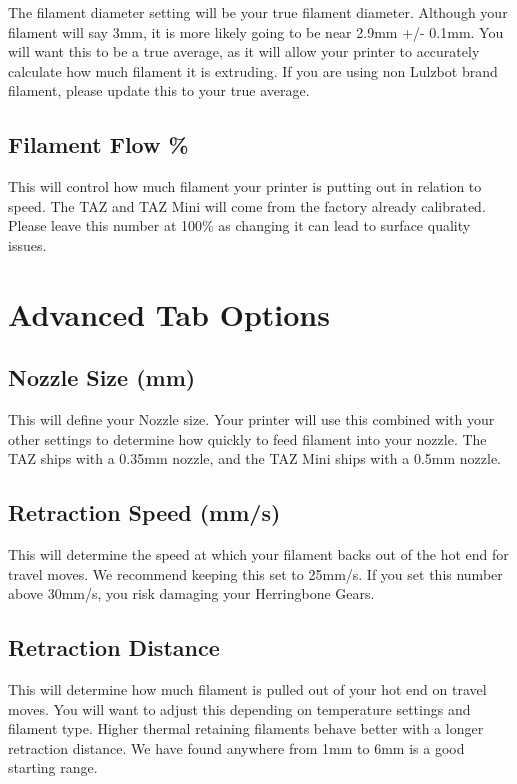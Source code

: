 The filament diameter setting will be your true filament diameter. Although your filament will say 3mm, it is more likely going to be near 2.9mm +/- 0.1mm. You will want this to be a true average, as it will allow your printer to accurately calculate how much filament it is extruding. If you are using non Lulzbot brand filament, please update this to your true average.

\subsection{Filament Flow \%}

This will control how much filament your printer is putting out in relation to speed. The TAZ and TAZ Mini will come from the factory already calibrated. Please leave this number at 100\% as changing it can lead to surface quality issues.

\section{Advanced Tab Options}

\subsection{Nozzle Size (mm)}

This will define your Nozzle size. Your printer will use this combined with your other settings to determine how quickly to feed filament into your nozzle. The TAZ ships with a 0.35mm nozzle, and the TAZ Mini ships with a 0.5mm nozzle.

\subsection{Retraction Speed (mm/s)}

This will determine the speed at which your filament backs out of the hot end for travel moves. We recommend keeping this set to 25mm/s. If you set this number above 30mm/s, you risk damaging your Herringbone Gears.

\subsection{Retraction Distance}

This will determine how much filament is pulled out of your hot end on travel moves. You will want to adjust this depending on temperature settings and filament type. Higher thermal retaining filaments behave better with a longer retraction distance. We have found anywhere from 1mm to 6mm is a good starting range.

